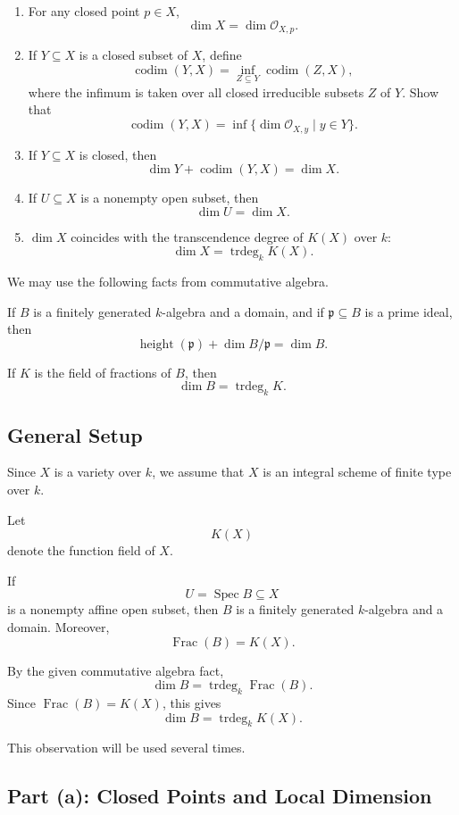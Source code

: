 \documentclass[12pt,a4paper]{article}
\DeclareMathOperator{\Spec}{Spec}
\newcommand{\Frac}{\operatorname{Frac}}
\newcommand{\codim}{\operatorname{codim}}
\newcommand{\trdeg}{\operatorname{trdeg}}
\providecommand{\Spec}{\operatorname{Spec}}
\theoremstyle{notespace}
\begin{document}
\begin{enumerate}[label=(\alph*)]
	\item For any closed point \(p\in X\),
	\[
	\dim X=\dim \mathcal O_{X,p}.
	\]
	
	\item If \(Y\subseteq X\) is a closed subset of \(X\), define
	\[
	\codim(Y,X)
	=
	\inf_{Z\subseteq Y}\codim(Z,X),
	\]
	where the infimum is taken over all closed irreducible subsets \(Z\) of \(Y\). Show that
	\[
	\codim(Y,X)
	=
	\inf\{\dim \mathcal O_{X,y}\mid y\in Y\}.
	\]
	
	\item If \(Y\subseteq X\) is closed, then
	\[
	\dim Y+\codim(Y,X)=\dim X.
	\]
	
	\item If \(U\subseteq X\) is a nonempty open subset, then
	\[
	\dim U=\dim X.
	\]
	
	\item \(\dim X\) coincides with the transcendence degree of \(K(X)\) over \(k\):
	\[
	\dim X=\trdeg_k K(X).
	\]
\end{enumerate}

We may use the following facts from commutative algebra.

If \(B\) is a finitely generated \(k\)-algebra and a domain, and if \(\mathfrak p\subseteq B\) is a prime ideal, then
\[
\operatorname{height}(\mathfrak p)+\dim B/\mathfrak p=\dim B.
\]

If \(K\) is the field of fractions of \(B\), then
\[
\dim B=\trdeg_k K.
\]

\subsection*{General Setup}

Since \(X\) is a variety over \(k\), we assume that \(X\) is an integral scheme of finite type over \(k\).

Let
\[
K(X)
\]
denote the function field of \(X\).

If
\[
U=\Spec B\subseteq X
\]
is a nonempty affine open subset, then \(B\) is a finitely generated \(k\)-algebra and a domain. Moreover,
\[
\Frac(B)=K(X).
\]

By the given commutative algebra fact,
\[
\dim B=\trdeg_k \Frac(B).
\]
Since \(\Frac(B)=K(X)\), this gives
\[
\dim B=\trdeg_k K(X).
\]

This observation will be used several times.

\subsection{Part (a): Closed Points and Local Dimension}
\end{document}
